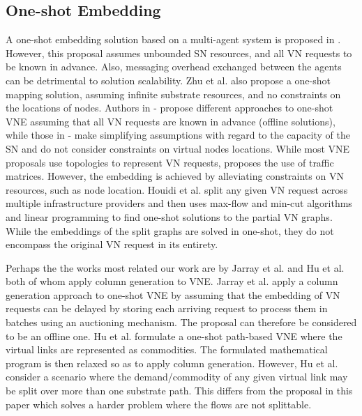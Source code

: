 \documentclass[journal]{IEEEtran}
\begin{document}
\subsection{One-shot Embedding}
A one-shot embedding solution based on a multi-agent system is proposed in \cite{Houidi08}. However, this proposal assumes unbounded \ac{SN} resources, and all \ac{VN} requests to be known in advance. Also, messaging overhead exchanged between the agents can be detrimental to solution scalability. Zhu et al. \cite{Zhu06} also propose a one-shot mapping solution, assuming infinite substrate resources, and no constraints on the locations of nodes. Authors in \cite{Infuhr11} - \cite{Schaffrath10} propose different approaches to one-shot VNE assuming that all VN requests are known in advance (offline solutions), while those in \cite{Lischka09} - \cite{Yu10} make simplifying assumptions with regard to the capacity of the \ac{SN} and do not consider constraints on virtual nodes locations. While most VNE proposals use topologies to represent VN requests, \cite{Wang11} proposes the use of traffic matrices. However, the embedding is achieved by alleviating constraints on \ac{VN} resources, such as node location. Houidi et al. \cite{Houidi11} split any given VN request across multiple infrastructure providers and then uses max-flow and min-cut algorithms and linear programming to find one-shot solutions to the partial VN graphs. While the embeddings of the split graphs are solved in one-shot, they do not encompass the original VN request in its entirety.

Perhaps the the works most related our work are by Jarray et al. \cite{JarrayA14} and Hu et al. \cite{QianHUYang13} both of whom apply column generation to VNE. Jarray et al. apply a column generation approach to one-shot VNE by assuming that the embedding of \ac{VN} requests can be delayed by storing each arriving request to process them in batches using an auctioning mechanism. The proposal can therefore be considered to be an offline one. Hu et al. formulate a one-shot path-based VNE where the virtual links are represented as commodities. The formulated mathematical program is then relaxed so as to apply column generation. However, Hu et al. consider a scenario where the demand/commodity of any given virtual link may be split over more than one substrate path. This differs from the proposal in this paper which solves a harder problem where the flows are not splittable.
\end{document}
